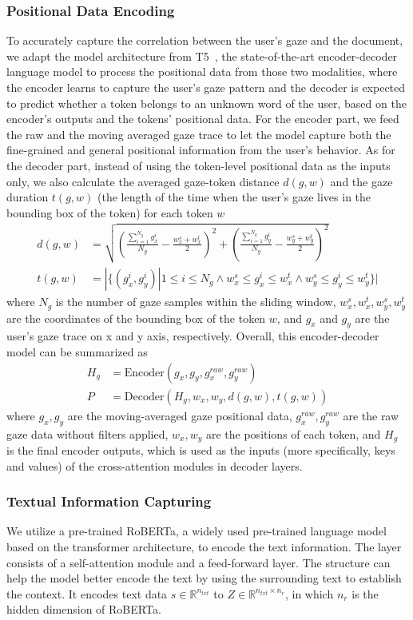 \subsubsection{Positional Data Encoding}
\label{sec:model_positional_data_encoding}
To accurately capture the correlation between the user's gaze and the document, we adapt the model architecture from T5~\cite{raffel2020exploring}, the state-of-the-art encoder-decoder language model to process the positional data from those two modalities, where the encoder learns to capture the user's gaze pattern and the decoder is expected to predict whether a token belongs to an unknown word of the user, based on the encoder's outputs and the tokens' positional data. For the encoder part, we feed the raw and the moving averaged gaze trace to let the model capture both the fine-grained and general positional information from the user's behavior. As for the decoder part, instead of using the token-level positional data as the inputs only, we also calculate the averaged gaze-token distance $d(g, w)$ and the gaze duration $t(g, w)$ (the length of the time when the user's gaze lives in the bounding box of the token) for each token $w$
\begin{align}
    d(g, w) &= \sqrt{(\frac{\sum_{i=1}^{N_g} g_x^i}{{N_g}} - \frac{w_x^s + w_x^t}{2}) ^ 2 + (\frac{\sum_{i=1}^{N_g} g_y^i}{{N_g}} - \frac{w_y^s + w_y^t}{2}) ^ 2} \\
    t(g, w) &= |\{(g_x^i, g_y^i)| 1 \le i \le N_g \land w_x^s \le g_x^i \le w_x^t \land w_y^s \le g_y^i \le w_y^t\}|
\end{align}
where $N_g$ is the number of gaze samples within the sliding window, $w_x^s, w_x^t, w_y^s, w_y^t$ are the coordinates of the bounding box of the token $w$, and $g_x$ and $g_y$ are the user's gaze trace on x and y axis, respectively. Overall, this encoder-decoder model can be summarized as
\begin{align}
    H_g &= \text{Encoder}(g_x, g_y, g_x^{raw}, g_y^{raw}) \\
    P &= \text{Decoder}(H_g, w_x, w_y, d(g, w), t(g, w))
\end{align}
where $g_x, g_y$ are the moving-averaged gaze positional data, $g_x^{raw}, g_y^{raw}$ are the raw gaze data without filters applied, $w_x, w_y$ are the positions of each token, and $H_g$ is the final encoder outputs, which is used as the inputs (more specifically, keys and values) of the cross-attention modules in decoder layers. 


\subsubsection{Textual Information Capturing}
\label{sec:model_text}
We utilize a pre-trained RoBERTa, a widely used pre-trained language model based on the transformer architecture, to encode the text information. The layer consists of a self-attention module and a feed-forward layer. The structure can help the model better encode the text by using the surrounding text to establish the context. It encodes text data $s \in \mathbb{R}^{n_{txt}}$ to $Z \in \mathbb{R}^{n_{txt} \times n_r}$, in which $n_r$ is the hidden dimension of RoBERTa.

